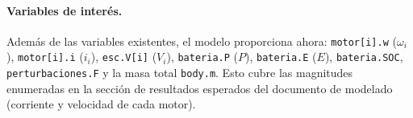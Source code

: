 \paragraph{Variables de interés.} Además de las variables existentes, el modelo
proporciona ahora: \texttt{motor[i].w} ($\omega_i$), \texttt{motor[i].i} ($i_i$),
\texttt{esc.V[i]} ($V_i$), \texttt{bateria.P} ($P$), \texttt{bateria.E} ($E$),
\texttt{bateria.SOC}, \texttt{perturbaciones.F} y la masa total \texttt{body.m}.
Esto cubre las magnitudes enumeradas en la sección de resultados esperados del
documento de modelado (corriente y velocidad de cada motor).
